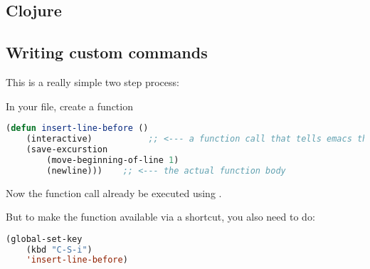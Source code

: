 \subsection{Clojure}



\subsection{Writing custom commands}
This is a really simple two step process: 

In your  file, create a function
\begin{lstlisting}[language=lisp]
(defun insert-line-before () 
    (interactive)           ;; <--- a function call that tells emacs that this is a function the user can call
    (save-excurstion 
        (move-beginning-of-line 1)
        (newline)))    ;; <--- the actual function body
\end{lstlisting}

Now the function call already be executed using .

But to make the function available via a shortcut, you also need to do: 
\begin{lstlisting}[language=lisp]
(global-set-key 
    (kbd "C-S-i")
    'insert-line-before)
\end{lstlisting}


